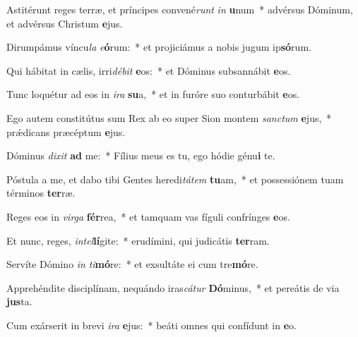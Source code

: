 \item Astitérunt reges terræ, et príncipes convené\textit{runt} \textit{in} \textbf{u}num~* advérsus Dóminum, et advérsus Christum \textbf{e}jus.
\item Dirumpámus víncu\textit{la} \textit{e}\textbf{ó}rum:~* et projiciámus a nobis jugum ip\textbf{só}rum.
\item Qui hábitat in cælis, irri\textit{dé}\textit{bit} \textbf{e}os:~* et Dóminus subsannábit \textbf{e}os.
\item Tunc loquétur ad eos in \textit{i}\textit{ra} \textbf{su}a,~* et in furóre suo conturbábit \textbf{e}os.
\item Ego autem constitútus sum Rex ab eo super Sion montem \textit{sanc}\textit{tum} \textbf{e}jus,~* prǽdicans præcéptum \textbf{e}jus.
\item Dóminus \textit{di}\textit{xit} \textbf{ad} me:~* Fílius meus es tu, ego hódie génu\textbf{i} te.
\item Póstula a me, et dabo tibi Gentes heredi\textit{tá}\textit{tem} \textbf{tu}am,~* et possessiónem tuam términos \textbf{ter}ræ.
\item Reges eos in \textit{vir}\textit{ga} \textbf{fér}rea,~* et tamquam vas fíguli confrínges \textbf{e}os.
\item Et nunc, reges, \textit{in}\textit{tel}\textbf{lí}gite:~* erudímini, qui judicátis \textbf{ter}ram.
\item Servíte Dómino \textit{in} \textit{ti}\textbf{mó}re:~* et exsultáte ei cum tre\textbf{mó}re.
\item Apprehéndite disciplínam, nequándo iras\textit{cá}\textit{tur} \textbf{Dó}minus,~* et pereátis de via \textbf{jus}ta.
\item Cum exárserit in brevi \textit{i}\textit{ra} \textbf{e}jus:~* beáti omnes qui confídunt in \textbf{e}o.

